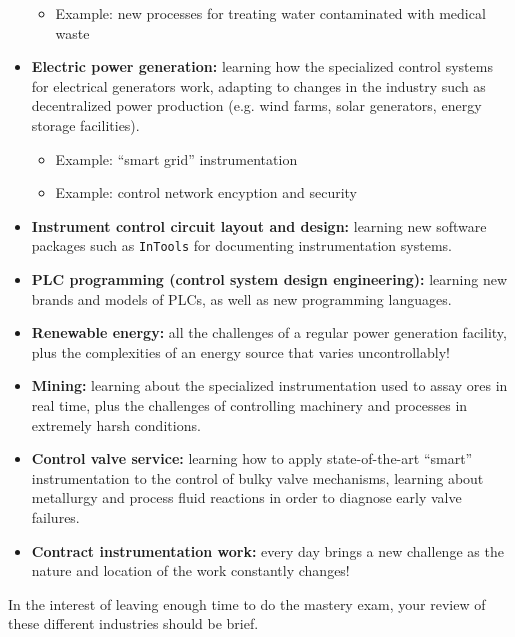 \begin{itemize}
\begin{itemize}
\item{} Example: new processes for treating water contaminated with medical waste
\end{itemize}
\item{} {\bf Electric power generation:} learning how the specialized control systems for electrical generators work, adapting to changes in the industry such as decentralized power production (e.g. wind farms, solar generators, energy storage facilities).
\begin{itemize}

\item{} Example: ``smart grid'' instrumentation
\item{} Example: control network encyption and security
\end{itemize}
\item{} {\bf Instrument control circuit layout and design:} learning new software packages such as {\tt InTools} for documenting instrumentation systems.
\item{} {\bf PLC programming (control system design engineering):} learning new brands and models of PLCs, as well as new programming languages.
\item{} {\bf Renewable energy:} all the challenges of a regular power generation facility, plus the complexities of an energy source that varies uncontrollably!
\item{} {\bf Mining:} learning about the specialized instrumentation used to assay ores in real time, plus the challenges of controlling machinery and processes in extremely harsh conditions.
\item{} {\bf Control valve service:} learning how to apply state-of-the-art ``smart'' instrumentation to the control of bulky valve mechanisms, learning about metallurgy and process fluid reactions in order to diagnose early valve failures.  
\item{} {\bf Contract instrumentation work:} every day brings a new challenge as the nature and location of the work constantly changes!
\end{itemize}

In the interest of leaving enough time to do the mastery exam, your review of these different industries should be brief.




